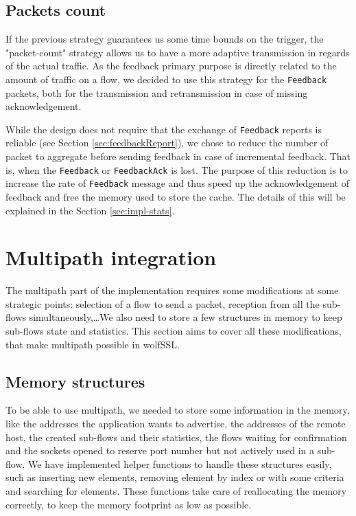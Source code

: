 \subsection{Packets count}

If the previous strategy guarantees us some time bounds on the trigger, the "packet-count" strategy allows us to have a more adaptive transmission in regards of the actual traffic. As the feedback primary purpose is directly related to the amount of traffic on a flow, we decided to use this strategy for the \texttt{Feedback} packets, both for the transmission and retransmission in case of missing acknowledgement.

While the design does not require that the exchange of \texttt{Feedback} reports is reliable (see Section \ref{sec:feedbackReport}), we chose to reduce the number of packet to aggregate before sending feedback in case of incremental feedback. That is, when the \texttt{Feedback} or \texttt{FeedbackAck} is lost. The purpose of this reduction is to increase the rate of \texttt{Feedback} message and thus speed up the acknowledgement of feedback and free the memory used to store the cache. The details of this will be explained in the Section \ref{sec:impl-stats}.

\section{Multipath integration}

The multipath part of the implementation requires some modifications at some strategic points: selection of a flow to send a packet, reception from all the sub-flows simultaneously,\dots We also need to store a few structures in memory to keep sub-flows state and statistics. This section aims to cover all these modifications, that make multipath possible in wolfSSL.

\subsection{Memory structures}

To be able to use multipath, we needed to store some information in the memory, like the addresses the application wants to advertise, the addresses of the remote host, the created sub-flows and their statistics, the flows waiting for confirmation and the sockets opened to reserve port number but not actively used in a sub-flow. We have implemented helper functions to handle these structures easily, such as inserting new elements, removing element by index or with some criteria and searching for elements. These functions take care of reallocating the memory correctly, to keep the memory footprint as low as possible.

